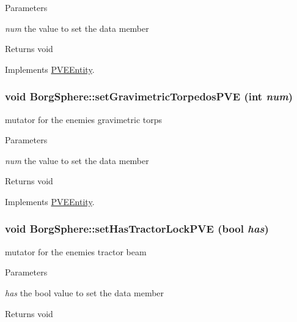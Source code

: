 \begin{DoxyParams}{Parameters}
\item[{\em num}]the value to set the data member\end{DoxyParams}
\begin{DoxyReturn}{Returns}
void 
\end{DoxyReturn}


Implements \hyperlink{classPVEEntity}{PVEEntity}.

\hypertarget{classBorgSphere_a9f2faa73e4f5ffee824ac4fa2e66670d}{
\subsubsection[{setGravimetricTorpedosPVE}]{\setlength{\rightskip}{0pt plus 5cm}void BorgSphere::setGravimetricTorpedosPVE (int {\em num})}}
\label{d6/ddd/classBorgSphere_a9f2faa73e4f5ffee824ac4fa2e66670d}
mutator for the enemies gravimetric torps


\begin{DoxyParams}{Parameters}
\item[{\em num}]the value to set the data member\end{DoxyParams}
\begin{DoxyReturn}{Returns}
void 
\end{DoxyReturn}


Implements \hyperlink{classPVEEntity}{PVEEntity}.

\hypertarget{classBorgSphere_af53789c3cd02dfb98bfb23e3f91a3822}{
\subsubsection[{setHasTractorLockPVE}]{\setlength{\rightskip}{0pt plus 5cm}void BorgSphere::setHasTractorLockPVE (bool {\em has})}}
\label{d6/ddd/classBorgSphere_af53789c3cd02dfb98bfb23e3f91a3822}
mutator for the enemies tractor beam


\begin{DoxyParams}{Parameters}
\item[{\em has}]the bool value to set the data member\end{DoxyParams}
\begin{DoxyReturn}{Returns}
void 
\end{DoxyReturn}



